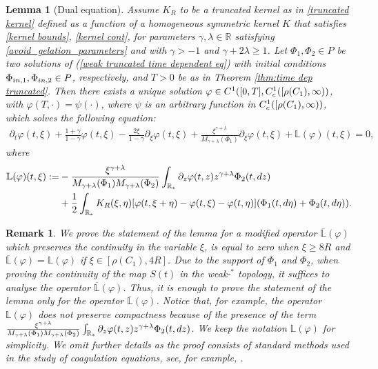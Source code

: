 \documentclass[11pt]{article}
\numberwithin{equation}{section}
\theoremstyle{plain}
\newtheorem{lemma}[theorem]{Lemma}
\newtheorem{remark}[theorem]{Remark}
\newcommand{\der}{\textup{d}}
\begin{document}
\begin{lemma}[Dual equation] \label{lem:dual eq} 
Assume $K_R$ to be a truncated kernel as in \eqref{truncated kernel} defined as a function of a homogeneous symmetric kernel $K$ that satisfies \eqref{kernel bounds},  \eqref{kernel cont},  for parameters $\gamma , \lambda \in \mathbb R $ satisfying \eqref{avoid_gelation_parameters} and with $\gamma > -1$ and $\gamma + 2 \lambda \geq 1 $. 
Let $\Phi_{1},\Phi_{2}\in P$ be two solutions of (\ref{weak truncated time dependent eq}) with initial conditions $\Phi_{\textup{in},1},\Phi_{\textup{in},2}\in P$, respectively, and $T>0$ be as in Theorem \ref{thm:time dep truncated}. Then there exists a unique solution $\varphi\in\textup{C}^{1}([0,T],\textup{C}^{1}_{c}([\rho(C_{1}),\infty))$, with $\varphi(T,\cdot)=\psi(\cdot)$, where $\psi$ is an arbitrary function in $\textup{C}^{1}_{c}([\rho(C_{1}),\infty))$, which solves the following equation: 
\begin{align} \label{eq:dual}  
    \partial_{t}\varphi(t, \xi)+ \frac{1+\gamma}{1-\gamma}   \varphi(t, \xi)  -
\frac{2\xi}{1-\gamma} \partial_\xi \varphi(t, \xi)  + \frac{   \xi^{\gamma + \lambda}}{M_{\gamma +\lambda}(\Phi_1)}\partial_\xi \varphi(t, \xi) +\mathbb{L}(\varphi)(t,\xi)=0,
\end{align}
where
\begin{align*}
     \mathbb{L}(\varphi)(t,\xi):=& -  \frac{\xi^{\gamma+\lambda} }{M_{\gamma+\lambda}(\Phi_1)  M_{\gamma+\lambda}(\Phi_2)  } \int_{\mathbb R_*} \partial_z \varphi(t, z) z^{\gamma+\lambda} \Phi_2(t, \der z)   \\ 
  & +  \frac{1}{2}\int_{\mathbb R_*} K_{R}(\xi,\eta)[\varphi(t,\xi+\eta)-\varphi(t,\xi)-\varphi(t,\eta)](\Phi_{1}(t, \der \eta)+\Phi_{2}(t, \der \eta)). 
\end{align*}
\end{lemma}
\begin{remark}
We prove the statement of the lemma for a modified operator  $\overline{\mathbb L}(\varphi)$ which preserves the continuity in the variable $\xi$, is equal to zero when $\xi\geq 8R$ and $\overline{\mathbb L}(\varphi)={\mathbb L}(\varphi)$ if $\xi\in[\rho(C_{1}),4R]$. Due to the support of $\Phi_{1}$ and $\Phi_{2}$, when proving the continuity of the map  $S(t)$ in the weak-$^\ast$ topology, it suffices to analyse the operator $\overline{\mathbb{L}}(\varphi)$. Thus, it is enough to prove the statement of the lemma only for the operator $\overline{\mathbb{L}}(\varphi)$. Notice that, for example, the operator $\mathbb{L}(\varphi)$ does not preserve compactness because of the presence of the term $\frac{\xi^{\gamma+\lambda} }{M_{\gamma+\lambda}(\Phi_1)  M_{\gamma+\lambda}(\Phi_2)  }\int_{\mathbb R_*} \partial_z \varphi(t, z) z^{\gamma+\lambda} \Phi_2(t, \der z)$. We keep the notation $\mathbb{L}(\varphi)$ for simplicity. We omit further details as the proof consists of standard methods used in the study of coagulation equations, see, for example, \cite{ferreira2019stationary}.
\end{remark}
\end{document}
